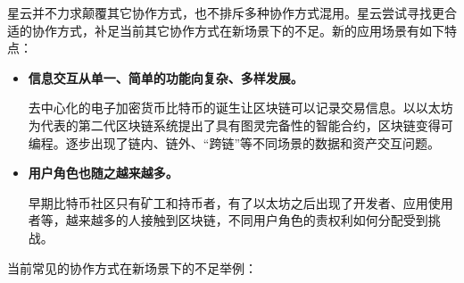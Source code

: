 星云并不力求颠覆其它协作方式，也不排斥多种协作方式混用。星云尝试寻找更合适的协作方式，补足当前其它协作方式在新场景下的不足。新的应用场景有如下特点：

\begin{itemize}
	\item \textbf{信息交互从单⼀、简单的功能向复杂、多样发展。}
	
	去中心化的电子加密货币比特币的诞生让区块链可以记录交易信息。以以太坊为代表的第二代区块链系统提出了具有图灵完备性的智能合约，区块链变得可编程。逐步出现了链内、链外、“跨链”等不同场景的数据和资产交互问题。

	\item \textbf{用户角色也随之越来越多。}

	早期比特币社区只有矿工和持币者，有了以太坊之后出现了开发者、应用使用者等，越来越多的人接触到区块链，不同用户角色的责权利如何分配受到挑战。

\end{itemize}

当前常见的协作方式在新场景下的不足举例：

